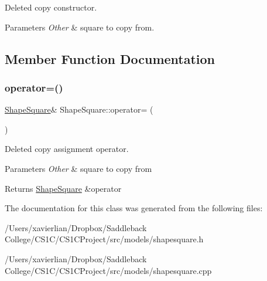 Deleted copy constructor. 


\begin{DoxyParams}{Parameters}
{\em Other} & square to copy from. \\
\hline
\end{DoxyParams}


\subsection{Member Function Documentation}
\mbox{\label{class_shape_square_af1909440887eed998f5723c8511a0432}} 
\subsubsection{\texorpdfstring{operator=()}{operator=()}}
{\footnotesize\ttfamily \mbox{\hyperlink{class_shape_square}{Shape\+Square}}\& Shape\+Square\+::operator= (\begin{DoxyParamCaption}\item[{const \mbox{\hyperlink{class_shape_square}{Shape\+Square}} \&}]{ }\end{DoxyParamCaption})\hspace{0.3cm}{\ttfamily [delete]}}



Deleted copy assignment operator. 


\begin{DoxyParams}{Parameters}
{\em Other} & square to copy from \\
\hline
\end{DoxyParams}
\begin{DoxyReturn}{Returns}
\mbox{\hyperlink{class_shape_square}{Shape\+Square}} \&operator 
\end{DoxyReturn}


The documentation for this class was generated from the following files\+:\begin{DoxyCompactItemize}
\item 
/\+Users/xavierlian/\+Dropbox/\+Saddleback College/\+C\+S1\+C/\+C\+S1\+C\+Project/src/models/shapesquare.\+h\item 
/\+Users/xavierlian/\+Dropbox/\+Saddleback College/\+C\+S1\+C/\+C\+S1\+C\+Project/src/models/shapesquare.\+cpp\end{DoxyCompactItemize}
